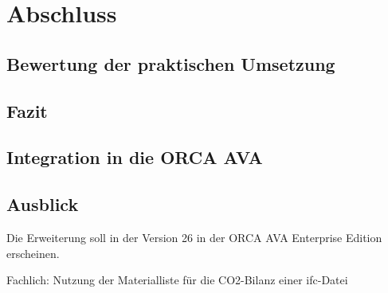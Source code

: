 \chapter{Abschluss}
\label{c:closing}

\section{Bewertung der praktischen Umsetzung}
\label{c:closing:rating}
\section{Fazit}
\label{c:closing:conclusion}
\section{Integration in die ORCA AVA}
\label{c:closing:integration}
\section{Ausblick}
\label{c:closing:outlook}
Die Erweiterung soll in der Version 26 in der ORCA AVA Enterprise Edition erscheinen.

Fachlich: Nutzung der Materialliste für die CO2-Bilanz einer \ac{ifc}-Datei
